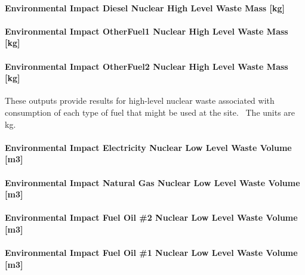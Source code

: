 \paragraph{Environmental Impact Diesel Nuclear High Level Waste Mass {[}kg{]}}\label{environmental-impact-diesel-nuclear-high-level-waste-mass-kg}

\paragraph{Environmental Impact OtherFuel1 Nuclear High Level Waste Mass {[}kg{]}}\label{environmental-impact-otherfuel1-nuclear-high-level-waste-mass-kg}

\paragraph{Environmental Impact OtherFuel2 Nuclear High Level Waste Mass {[}kg{]}}\label{environmental-impact-otherfuel2-nuclear-high-level-waste-mass-kg}

These outputs provide results for high-level nuclear waste associated with consumption of each type of fuel that might be used at the site.~ The units are kg.

\paragraph{Environmental Impact Electricity Nuclear Low Level Waste Volume {[}m3{]}}\label{environmental-impact-electricity-nuclear-low-level-waste-volume-m3}

\paragraph{Environmental Impact Natural Gas Nuclear Low Level Waste Volume {[}m3{]}}\label{environmental-impact-natural-gas-nuclear-low-level-waste-volume-m3}

\paragraph{Environmental Impact Fuel Oil \#2 Nuclear Low Level Waste Volume {[}m3{]}}\label{environmental-impact-fuel-oil-2-nuclear-low-level-waste-volume-m3}

\paragraph{Environmental Impact Fuel Oil \#1 Nuclear Low Level Waste Volume {[}m3{]}}\label{environmental-impact-fuel-oil-1-nuclear-low-level-waste-volume-m3}

